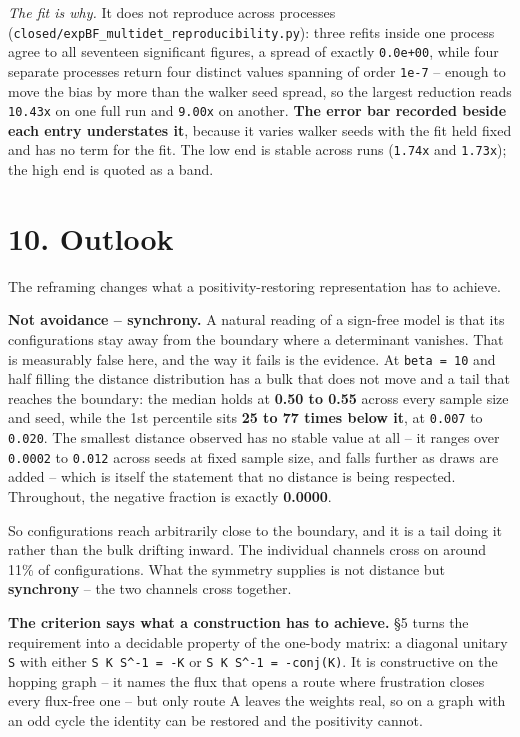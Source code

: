 \documentclass[10pt,letterpaper,twocolumn]{article}
\begin{document}
\emph{The fit is why.} It does not reproduce across processes
(\texttt{closed/\allowbreak{}expBF\_\allowbreak{}multidet\_\allowbreak{}reproducibility.\allowbreak{}py}): three refits inside one process agree to all
seventeen significant figures, a spread of exactly \texttt{0.\allowbreak{}0e+\allowbreak{}00}, while four separate processes return
four distinct values spanning of order \texttt{1e-{}\allowbreak{}7} -- enough to move the bias by more than the walker
seed spread, so the largest reduction reads \texttt{10.\allowbreak{}43x} on one full run and \texttt{9.\allowbreak{}00x} on another. \textbf{The
error bar recorded beside each entry understates it}, because it varies walker seeds with the fit
held fixed and has no term for the fit. The low end is stable across runs (\texttt{1.\allowbreak{}74x} and \texttt{1.\allowbreak{}73x});
the high end is quoted as a band.

\section{10. Outlook}\label{10-outlook}

The reframing changes what a positivity-restoring representation has to achieve.

\textbf{Not avoidance -- synchrony.} A natural reading of a sign-free model is that its configurations
stay away from the boundary where a determinant vanishes. That is measurably false here, and the
way it fails is the evidence. At \texttt{beta\ =\allowbreak{}\ 10} and half filling the distance distribution has a bulk
that does not move and a tail that reaches the boundary: the median holds at \textbf{0.50 to 0.55} across
every sample size and seed, while the 1st percentile sits \textbf{25 to 77 times below it}, at \texttt{0.\allowbreak{}007} to
\texttt{0.\allowbreak{}020}. The smallest distance observed has no stable value at all -- it ranges over \texttt{0.\allowbreak{}0002} to
\texttt{0.\allowbreak{}012} across seeds at fixed sample size, and falls further as draws are added -- which is itself
the statement that no distance is being respected. Throughout, the negative fraction is exactly
\textbf{0.0000}.

So configurations reach arbitrarily close to the boundary, and it is a tail doing it rather than
the bulk drifting inward. The individual channels cross on around 11\% of configurations. What the
symmetry supplies is not distance but \textbf{synchrony} -- the two channels cross together.

\textbf{The criterion says what a construction has to achieve.} §5 turns the
requirement into a decidable property of the one-body matrix: a diagonal unitary \texttt{S} with either
\texttt{S\ K\ S\^{}-{}\allowbreak{}1\ =\allowbreak{}\ -{}\allowbreak{}K} or \texttt{S\ K\ S\^{}-{}\allowbreak{}1\ =\allowbreak{}\ -{}\allowbreak{}conj(\allowbreak{}K)\allowbreak{}}. It is constructive on the hopping graph -- it names the flux that
opens a route where frustration closes every flux-free one -- but only route A leaves the weights
real, so on a graph with an odd cycle the identity can be restored and the positivity cannot.
\end{document}

